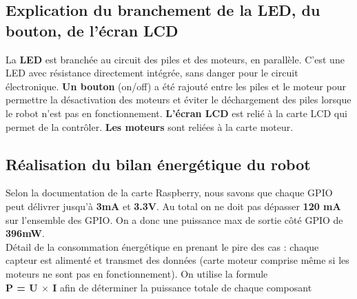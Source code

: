         \vspace{5mm}
\subsection{Explication du branchement de la LED, du bouton, de l'écran LCD}

        La \textbf{LED} est branchée au circuit des piles et des moteurs, en parallèle. C'est une LED avec résistance directement intégrée, sans danger pour le circuit électronique. 
        \textbf{Un bouton} (on/off) a été rajouté entre les piles et le moteur pour permettre la désactivation des moteurs et éviter le déchargement des piles lorsque le robot n'est pas en fonctionnement.
        \textbf{L'écran LCD} est relié à la carte LCD qui permet de la contrôler.
        \textbf{Les moteurs} sont reliées à la carte moteur.

\subsection{Réalisation du bilan énergétique du robot}

        Selon la documentation de la carte Raspberry, nous savons que chaque GPIO peut délivrer jusqu'à \textbf{3mA} et \textbf{3.3V}. Au total on ne doit pas dépasser \textbf{120 mA} sur l'ensemble des GPIO. On a donc une puissance max de sortie côté GPIO de \textbf{396mW}.\\
        Détail de la consommation énergétique en prenant le pire des cas : chaque capteur est alimenté et transmet des données (carte moteur comprise même si les moteurs ne sont pas en fonctionnement).
        On utilise la formule \\  \textbf{P = U $\times$ I} afin de déterminer la puissance totale de chaque composant

